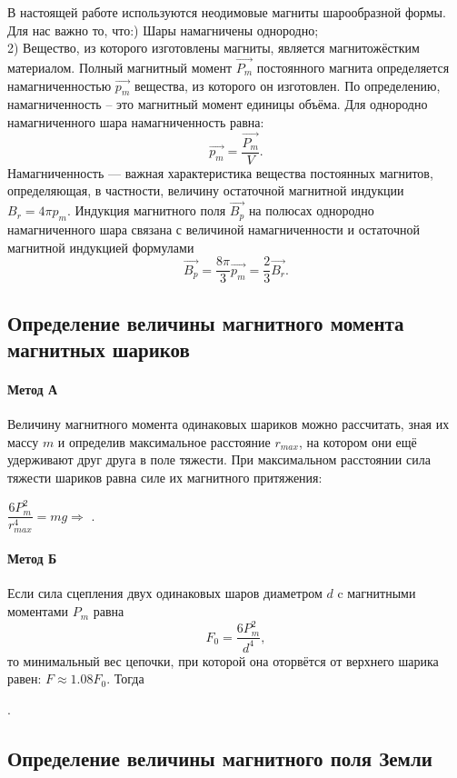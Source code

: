 	В настоящей работе используются неодимовые магниты шарообразной формы.
Для нас важно то, что:\n{}) Шары намагничены однородно;\\
2) Вещество, из которого изготовлены магниты, является магнитожёстким материалом.\n\n
Полный магнитный момент $\overrightarrow{P_m}$
постоянного магнита определяется намагниченностью $\overrightarrow{p_m}$
вещества, из которого он изготовлен. По определению, намагниченность – это магнитный момент единицы объёма. Для однородно намагниченного шара намагниченность равна:
$$
\overrightarrow{p_m}=\dfrac{\overrightarrow{P_m}}{V}.
$$
Намагниченность — важная характеристика вещества постоянных магнитов, определяющая, в
частности, величину остаточной магнитной индукции $B_r = 4\pi p_m$. Индукция магнитного поля $\overrightarrow{B_p}$
на полюсах однородно намагниченного шара связана с величиной намагниченности и остаточной магнитной индукцией формулами
$$
\overrightarrow{B_p}=\dfrac{8\pi}{3}\overrightarrow{p_m}=\dfrac{2}{3}\overrightarrow{B_r}.
$$
\subsection*{Определение величины магнитного момента магнитных шариков}
\paragraph*{Метод А}\n
Величину магнитного момента одинаковых шариков
можно рассчитать, зная их массу $m$ и определив максимальное расстояние $r_{max}$, на котором они ещё удерживают друг
друга в поле тяжести. При максимальном расстоянии сила тяжести шариков равна силе их магнитного притяжения:
\begin{center}
$\dfrac{6P_m^2}{r_{max}^4}=mg\Rightarrow$  .
\end{center}
\paragraph*{Метод Б}\n
Если сила сцепления двух одинаковых шаров диаметром $d$ c магнитными моментами $P_m$ равна
$$
F_0 = \dfrac{6P_m^2}{d^4},
$$
то минимальный вес цепочки, при которой она оторвётся от верхнего шарика равен: $F \approx 1.08 F_0$. Тогда
\begin{center}
 .
\end{center}
\subsection*{Определение величины магнитного поля Земли}
